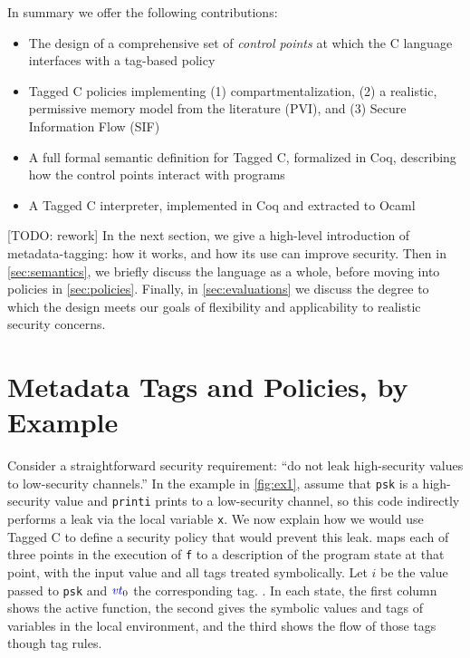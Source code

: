 \documentclass{llncs}
\begin{document}
In summary we offer the following contributions:

\begin{itemize}
\item The design of a comprehensive set of {\em control points} at which the C language interfaces with a tag-based policy
\item Tagged C policies implementing (1) compartmentalization,
  (2) a realistic, permissive memory model from the literature (PVI),
  and (3) Secure Information Flow (SIF)
\item A full formal semantic definition for Tagged C, formalized in Coq, describing how the control points
  interact with programs
\item A Tagged C interpreter, implemented in Coq and extracted to Ocaml
\end{itemize}

[TODO: rework]
In the next section, we give a high-level introduction of metadata-tagging: how it works,
and how its use can improve security. Then in \cref{sec:semantics}, we briefly discuss the
language as a whole, before moving into policies in \cref{sec:policies}. Finally, in
\cref{sec:evaluations} we discuss the degree to
which the design meets our goals of flexibility and applicability to realistic
security concerns.

\section{Metadata Tags and Policies, by Example}

Consider a straightforward security requirement: ``do not leak high-security values to low-security channels.''
In the example in \cref{fig:ex1}, assume that {\tt psk} is a high-security value and {\tt printi} prints to a low-security
channel, so this code indirectly performs a leak via the local variable {\tt x}.  We now explain how we would use Tagged C
to define a security policy that would prevent this leak.  
 maps each of three points
in the execution of {\tt f} to a description of the program state at that point,
with the input value and all tags treated symbolically. Let \(i\) be the value passed to {\tt psk}
and \(\mathit{\color{blue} vt}_0\) the corresponding tag. . In each state, the first column
shows the active function, the second gives the symbolic values and tags
of variables in the local environment, and the third shows the flow of those tags though
tag rules.
\end{document}
